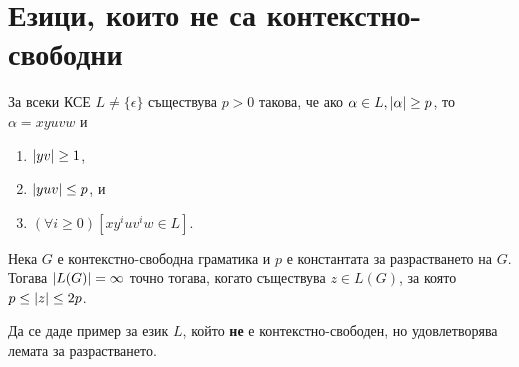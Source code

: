 

\section{Езици, които не са контекстно-свободни}

\begin{lemma}
  \label{lem:pumping-context} 
  За всеки КСЕ $L\neq\{\epsilon\}$ съществува $p>0$ такова,
  че ако $\alpha\in L, \vert{\alpha}\vert \geq p$, то $\alpha=xyuvw$ и
  \begin{enumerate}
  \item
    $\vert{yv}\vert\geq 1$,
  \item
    $\vert{yuv}\vert\leq p$, и
  \item
    $(\forall i\geq 0)[xy^iuv^iw\in L]$.
\end{enumerate}
\end{lemma}

\begin{crl}
  Нека $G$ е контекстно-свободна граматика и $p$ е константата за разрастването на $G$.
  Тогава $\vert{L(G)}\vert = \infty$ точно тогава, когато съществува $z \in L(G)$, за която $p \leq \vert{z}\vert \leq 2p$.
\end{crl}

\begin{problem}
  Да се даде пример за език $L$, който {\bf не} е контекстно-свободен, но удовлетворява
  лемата за разрастването.
\end{problem}

